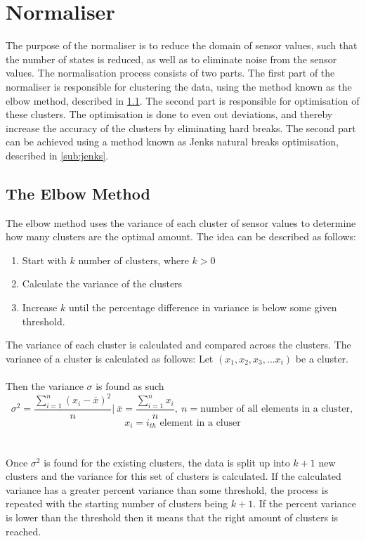 \section{Normaliser}
\label{sec:normaliser}
The purpose of the normaliser is to reduce the domain of sensor values, such that the number of states is reduced, as well as to eliminate noise from the sensor values. The normalisation process consists of two parts. The first part of the normaliser is responsible for clustering the data, using the method known as the elbow method, described in \cref{sub:elbow_method}. The second part is responsible for optimisation of these clusters. The optimisation is done to even out deviations, and thereby increase the accuracy of the clusters by eliminating hard breaks. The second part can be achieved using a method known as Jenks natural breaks optimisation, described in \cref{sub:jenks}.

\subsection{The Elbow Method}
\label{sub:elbow_method}
The elbow method uses the variance of each cluster of sensor values to determine how many clusters are the optimal amount. The idea can be described as follows:
\begin{enumerate}
\item Start with $k$ number of clusters, where $k>0$
\item Calculate the variance of the clusters
\item Increase $k$ until the percentage difference in variance is below some given threshold.
\end{enumerate}
The variance of each cluster is calculated and compared across the clusters. The variance of a cluster is calculated as follows:
Let $(x_1,x_2,x_3,...x_i)$ be a cluster.
\\\\Then the variance $\sigma$ is found as such
$$\sigma^2 = \frac{\displaystyle\sum_{i = 1}^{n}(x_{i}-\overline{x})^2 }{n} \Biggr\rvert\ \overline{x}  =\frac{\displaystyle\sum_{i=1}^{n}x_{i}}{n},\ n =\text{number of all elements in a cluster} ,$$
$$ x_{i} = i_{th} \text{ element in a cluser} $$
\\\\
Once $\sigma^2$ is found for the existing clusters, the data is split up into $k+1$ new clusters and the variance for this set of clusters is calculated. If the calculated variance has a greater percent variance than some threshold, the process is repeated with the starting number of clusters being $k+1$. If the percent variance is lower than the threshold then it means that the right amount of clusters is reached.
